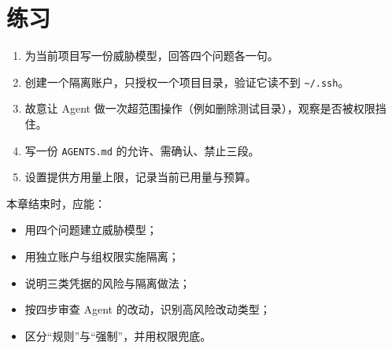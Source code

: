 \section{练习}

\begin{enumerate}
  \item 为当前项目写一份威胁模型，回答四个问题各一句。
  \item 创建一个隔离账户，只授权一个项目目录，验证它读不到 \texttt{\textasciitilde/.ssh}。
  \item 故意让 Agent 做一次超范围操作（例如删除测试目录），观察是否被权限挡住。
  \item 写一份 \texttt{AGENTS.md} 的允许、需确认、禁止三段。
  \item 设置提供方用量上限，记录当前已用量与预算。
\end{enumerate}

\begin{checkpoint}
本章结束时，应能：
\begin{itemize}
  \item 用四个问题建立威胁模型；
  \item 用独立账户与组权限实施隔离；
  \item 说明三类凭据的风险与隔离做法；
  \item 按四步审查 Agent 的改动，识别高风险改动类型；
  \item 区分“规则”与“强制”，并用权限兜底。
\end{itemize}
\end{checkpoint}
